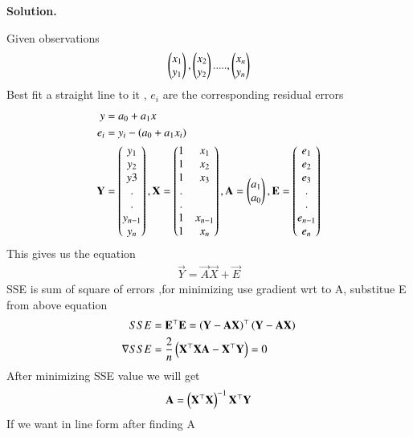 \documentclass[journal,12pt,twocolumn]{IEEEtran}
\begin{document}
	\textbf{Solution.}
	
	
	Given observations
	\begin{align}
		 \begin{pmatrix}x_1\\y_1\end{pmatrix},\begin{pmatrix}x_2\\y_2\end{pmatrix}.....,\begin{pmatrix}x_n\\y_n\end{pmatrix}
	\end{align}
	Best fit a straight line to it , $e_i$ are the corresponding residual errors
	      \begin{align}
	      	y&=a_0+a_1x\\
	      	e_i&=y_i-\left(a_0+a_1x_i\right)\\
	      	\mathbf{Y}&=\begin{pmatrix}y_1\\y_2\\y3\\.\\.\\y_{n-1}\\y_n\end{pmatrix},
	      	\mathbf{X}=\begin{pmatrix}1&x_1\\1&x_2\\1& x_3\\.&\\.&\\1&x_{n-1}\\1&x_n\end{pmatrix},
	      	\mathbf{A}=\begin{pmatrix}a_1\\a_0\end{pmatrix},
	      	\mathbf{E}=\begin{pmatrix}e_1\\e_2\\e_3\\.\\.\\e_{n-1}\\e_n\end{pmatrix}
	      	\end{align}
      	This gives us the equation
      	\begin{align}
      		\vec{Y}=\vec{A}\vec{X}+\vec{E}
      	\end{align}
SSE is sum of square of errors ,for minimizing use gradient wrt to A, substitue E from above equation
      \begin{align}
      	SSE&=\mathbf{E}^{\top}\mathbf{E} =\left(\mathbf{Y}-\mathbf{A}\mathbf{X}\right)^{\top}\left(\mathbf{Y}-\mathbf{A}\mathbf{X}\right)     \\
        \nabla SSE&=\frac{2}{n}\left(\mathbf{X}^{\top}\mathbf{X}\mathbf{A}-\mathbf{X}^{\top}\mathbf{Y}\right)=0        
  \end{align}
  After minimizing SSE value we will get
      \begin{align}
        \mathbf{A}=\left(\mathbf{X}^{\top}\mathbf{X}\right)^{-1}\mathbf{X}^{\top}\mathbf{Y}
      \end{align}
  If we want in line form after finding A
\end{document}
